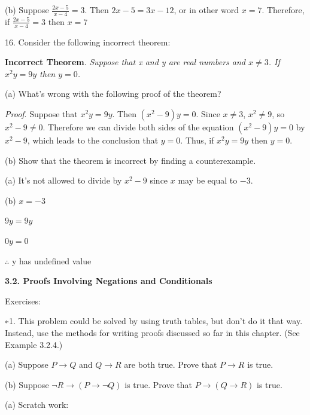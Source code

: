 \documentclass{article}
\begin{document}
(b) Suppose $\frac{2x-5}{x-4} = 3$. Then $2x - 5 = 3x - 12$, or in other word $x = 7$.
Therefore, if $\frac{2x-5}{x-4} = 3$ then $x = 7$

\vspace{30pt}

16. Consider the following incorrect theorem:

\textbf{Incorrect Theorem}. \textit{Suppose that x and y are real numbers and $x \neq 3$.
If $x^2y = 9y$ then $y = 0$.}

\hspace{12pt}(a) What’s wrong with the following proof of the theorem?

\textit{Proof}. Suppose that $x^2y = 9y$. Then $(x^2 - 9)y = 0$. Since $x \neq 3$,
$x^2 \neq 9$, so $x^2 - 9 \neq 0$. Therefore we can divide both sides of the
equation $(x^2 - 9)y = 0$ by $x^2 - 9$, which leads to the conclusion
that $y = 0$. Thus, if $x^2y = 9y$ then $y = 0$.

\hspace{12pt}(b) Show that the theorem is incorrect by finding a counterexample.

\vspace{20pt}

(a) It's not allowed to divide by $x^2 - 9$ since $x$ may be equal to $-3$.

\vspace{20pt}

(b) $x = -3$

$9y = 9y$

$0y = 0$

$\therefore$ y has undefined value

\vspace{50pt}

\textbf{3.2. Proofs Involving Negations and Conditionals}

Exercises:

∗1. This problem could be solved by using truth tables, but don't do it that
way. Instead, use the methods for writing proofs discussed so far in this
chapter. (See Example 3.2.4.)

\hspace{12pt}(a) Suppose $P \to Q$ and $Q \to R$ are both true. Prove that $P \to R$ is
true.

\hspace{12pt}(b) Suppose $\neg R \to (P \to \neg Q)$ is true. Prove that $P \to (Q \to R)$ is
true.
\vspace{20pt}

(a) Scratch work:
\end{document}
